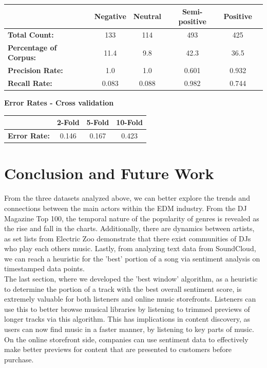 \documentclass[12pt]{dalcsthesis}
\begin{document}
 
\begin{center}
  \begin{tabular}{ l | c | c | c | c | c }
    \hline
	 & \textbf{Negative} & \textbf{Neutral} & \textbf{Semi-positive} & \textbf{Positive} \\ \hline
    \textbf{Total Count:} & 133 & 114 & 493 & 425 \\ \hline
    \textbf{Percentage of Corpus:} & 11.4 & 9.8 & 42.3 & 36.5 \\ \hline
    \textbf{Precision Rate:} & 1.0  & 1.0 & 0.601 & 0.932 \\ \hline
    \textbf{Recall Rate:} & 0.083 & 0.088 & 0.982 & 0.744 \\
    \hline
  \end{tabular}
\end{center}

\noindent
\textbf{Error Rates - Cross validation}

\begin{center}
  \begin{tabular}{ l | c | c | c }
    \hline
	 & \textbf{2-Fold} & \textbf{5-Fold} & \textbf{10-Fold} \\ \hline
    \textbf{Error Rate:} & 0.146 & 0.167 & 0.423 \\ 
    \hline
  \end{tabular}
\end{center}


\chapter{Conclusion and Future Work}

From the three datasets analyzed above, we can better explore the trends and connections between the main actors within the EDM industry. From the DJ Magazine Top 100, the temporal nature of the popularity of genres is revealed as the rise and fall in the charts. Additionally, there are dynamics between artists, as set lists from Electric Zoo demonstrate that there exist communities of DJs who play each others music. Lastly, from analyzing text data from SoundCloud, we can reach a heuristic for the 'best' portion of a song via sentiment analysis on timestamped data points. \\

The last section, where we developed the 'best window' algorithm, as a heuristic to determine the portion of a track with the best overall sentiment score, is extremely valuable for both listeners and online music storefronts. Listeners can use this to better browse musical libraries by listening to trimmed previews of longer tracks via this algorithm. This has implications in content discovery, as users can now find music in a faster manner, by listening to key parts of music. On the online storefront side, companies can use sentiment data to effectively make better previews for content that are presented to customers before purchase. \\
\end{document}
